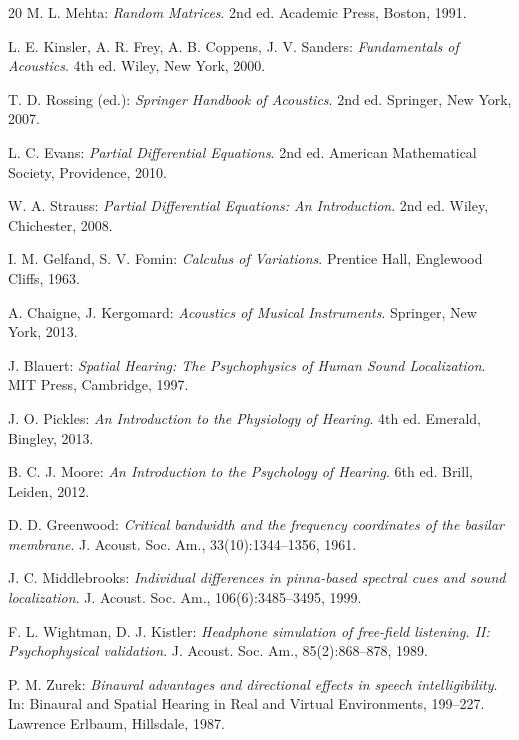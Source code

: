 ﻿\documentclass[12pt, a4paper]{article}
\theoremstyle{definition}
\theoremstyle{remark}
\begin{document}
\begin{thebibliography}{20}
  M. L. Mehta:
  \textit{Random Matrices}. 2nd ed.
  Academic Press, Boston, 1991.

  L. E. Kinsler, A. R. Frey, A. B. Coppens, J. V. Sanders:
  \textit{Fundamentals of Acoustics}. 4th ed.
  Wiley, New York, 2000.

  T. D. Rossing (ed.):
  \textit{Springer Handbook of Acoustics}. 2nd ed.
  Springer, New York, 2007.

  L. C. Evans:
  \textit{Partial Differential Equations}. 2nd ed.
  American Mathematical Society, Providence, 2010.

  W. A. Strauss:
  \textit{Partial Differential Equations: An Introduction}. 2nd ed.
  Wiley, Chichester, 2008.

  I. M. Gelfand, S. V. Fomin:
  \textit{Calculus of Variations}.
  Prentice Hall, Englewood Cliffs, 1963.

  A. Chaigne, J. Kergomard:
  \textit{Acoustics of Musical Instruments}.
  Springer, New York, 2013.

  J. Blauert:
  \textit{Spatial Hearing: The Psychophysics of Human Sound Localization}.
  MIT Press, Cambridge, 1997.

  J. O. Pickles:
  \textit{An Introduction to the Physiology of Hearing}. 4th ed.
  Emerald, Bingley, 2013.

  B. C. J. Moore:
  \textit{An Introduction to the Psychology of Hearing}. 6th ed.
  Brill, Leiden, 2012.

  D. D. Greenwood:
  \textit{Critical bandwidth and the frequency coordinates of the basilar membrane}.
  J. Acoust. Soc. Am., 33(10):1344--1356, 1961.

  J. C. Middlebrooks:
  \textit{Individual differences in pinna-based spectral cues and sound localization}.
  J. Acoust. Soc. Am., 106(6):3485--3495, 1999.

  F. L. Wightman, D. J. Kistler:
  \textit{Headphone simulation of free-field listening. II: Psychophysical validation}.
  J. Acoust. Soc. Am., 85(2):868--878, 1989.

  P. M. Zurek:
  \textit{Binaural advantages and directional effects in speech intelligibility}.
  In: Binaural and Spatial Hearing in Real and Virtual Environments, 199--227. Lawrence Erlbaum, Hillsdale, 1987.


\end{thebibliography}
\end{document}
